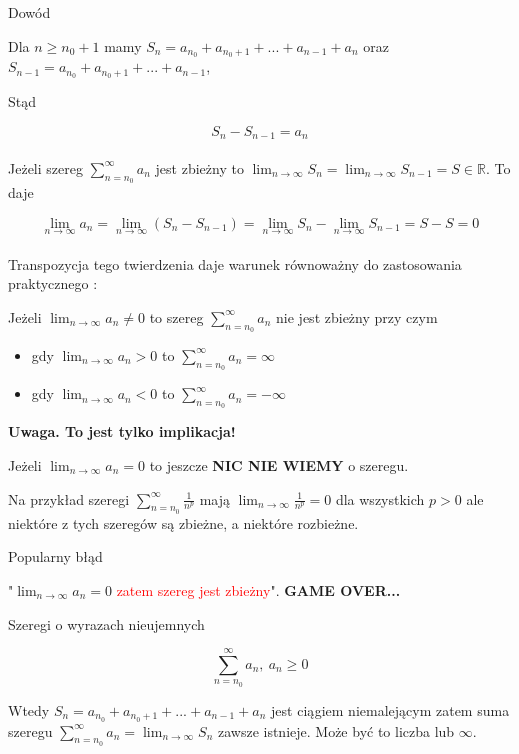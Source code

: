 Dowód 

Dla $ n \geq n_0 + 1 $ mamy $ S_n = a_{n_0} + a_{n_0 + 1} + ... + a_{n - 1} + a_n $ oraz 
$ S_{n - 1} = a_{n_0} + a_{n_0 + 1} + ... + a_{n - 1} $,

Stąd

$$ S_n - S_{n - 1} = a_n $$ \\

Jeżeli szereg $ \sum\limits_{n = n_0}^{\infty} a_n $ jest zbieżny to $ \lim_{n \to \infty} S_n = \lim_{n \to \infty} S_{n - 1} = S \in \mathbb{R} $.
To daje

$$ \lim_{n \to \infty} a_n = \lim_{n \to \infty} (S_n - S_{n - 1}) = \lim_{n \to \infty} S_n - \lim_{n \to \infty} S_{n - 1} = S - S = 0 $$ \\

Transpozycja tego twierdzenia daje warunek równoważny do zastosowania praktycznego :

Jeżeli $ \lim_{n \to \infty} a_n \neq 0 $ to szereg $ \sum\limits_{n = n_0}^{\infty} a_n $ nie jest zbieżny przy czym

\begin{itemize}
    \item gdy $ \lim_{n \to \infty} a_n > 0 $ to $ \sum\limits_{n = n_0}^{\infty} a_n = \infty $
    \item gdy $ \lim_{n \to \infty} a_n < 0 $ to $ \sum\limits_{n = n_0}^{\infty} a_n = -\infty $ 
\end{itemize}

\textbf{Uwaga. To jest tylko implikacja!}

Jeżeli $ \lim_{n \to \infty} a_n = 0 $ to jeszcze \textbf{NIC NIE WIEMY} o szeregu.

Na przykład szeregi $ \sum\limits_{n = n_0}^{\infty} \frac{1}{n^p} $ mają $ \lim_{n \to \infty} \frac{1}{n^p} = 0 $
dla wszystkich $ p > 0 $ ale niektóre z tych szeregów są zbieżne, a niektóre rozbieżne. \\

\begin{blad}{Popularny błąd}

"$\lim_{n \to \infty} a_n = 0 $ \textcolor{red}{zatem szereg jest zbieżny}". \textbf{GAME OVER...}
\end{blad}

Szeregi o wyrazach nieujemnych

$$ \sum\limits_{n = n_0}^{\infty} a_n, \ a_n \geq 0 $$

Wtedy $ S_n = a_{n_0} + a_{n_0 + 1} + ... + a_{n - 1} + a_n $ jest ciągiem niemalejącym zatem suma szeregu
$ \sum\limits_{n = n_0}^{\infty} a_n = \lim_{n \to \infty} S_n $ zawsze istnieje. Może być to liczba lub $\infty$.

